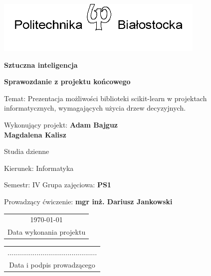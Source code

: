 \documentclass[10pt,a4paper]{article}
\begin{document}
\begin{titlepage}
	\centering
	\includegraphics[width=10cm]{media/PB_logo}\par\vspace{1cm}
	{\LARGE\bfseries Sztuczna inteligencja \par}
	\vspace{0.5cm}
	
	{\LARGE\bfseries Sprawozdanie z projektu końcowego\par}
	\vspace{1.5cm}
	
	{\Large Temat: Prezentacja możliwości biblioteki scikit-learn w projektach informatycznych, wymagających użycia drzew decyzyjnych.\par}
	\vspace{3cm}
	
	\raggedright
	
	
 	{\large Wykonujący projekt: \textbf{Adam Bajguz}\\
 			\makebox[0pt][l]{}\phantom{Wykonujący projekt: }\textbf{Magdalena Kalisz}\par}
 	\vspace{1cm}
 	
 	{\large Studia dzienne \par
	Kierunek: Informatyka \par
	Semestr: IV \hspace{2.5cm} Grupa zajęciowa: \textbf{PS1} \par
	Prowadzący ćwiczenie: \textbf{mgr inż. Dariusz Jankowski} \par}
 	
	\vfill
		
	\begin{tabular}{c}
	\today\\
	Data wykonania projektu
	\end{tabular}
	
	\begin{flushright}
	\begin{tabular}{c}
	..............................................\\
	Data i podpis prowadzącego
	\end{tabular}
	\end{flushright}

\end{titlepage}
\end{document}
